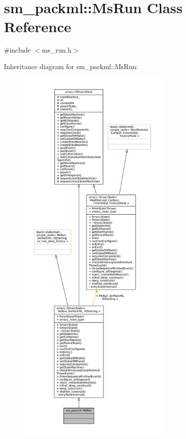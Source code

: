 \hypertarget{classsm__packml_1_1MsRun}{}\section{sm\+\_\+packml\+:\+:Ms\+Run Class Reference}
\label{classsm__packml_1_1MsRun}


{\ttfamily \#include $<$ms\+\_\+run.\+h$>$}



Inheritance diagram for sm\+\_\+packml\+:\+:Ms\+Run\+:
\nopagebreak
\begin{figure}[H]
\begin{center}
\leavevmode
\includegraphics[height=550pt]{classsm__packml_1_1MsRun__inherit__graph}
\end{center}
\end{figure}


